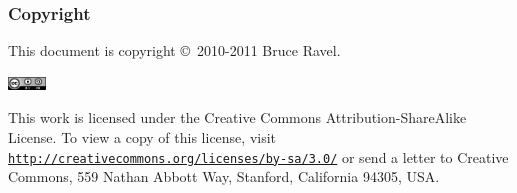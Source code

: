 
\begin{frame}
  \frametitle{Copyright}
  \tiny

  This document is copyright \copyright\ 2010-2011 Bruce Ravel.

  \begin{center}
    \includegraphics[width=1.0cm]{cc-by-sa.png}
  \end{center}

  This work is licensed under the Creative Commons
  Attribution-ShareAlike License.  To view a copy of this license,
  visit \href{http://creativecommons.org/licenses/by-sa/3.0/}
  {\color{Purple4}\texttt{http://creativecommons.org/licenses/by-sa/3.0/}}
  or send a letter to Creative Commons, 559 Nathan Abbott Way,
  Stanford, California 94305, USA.


\end{frame}
